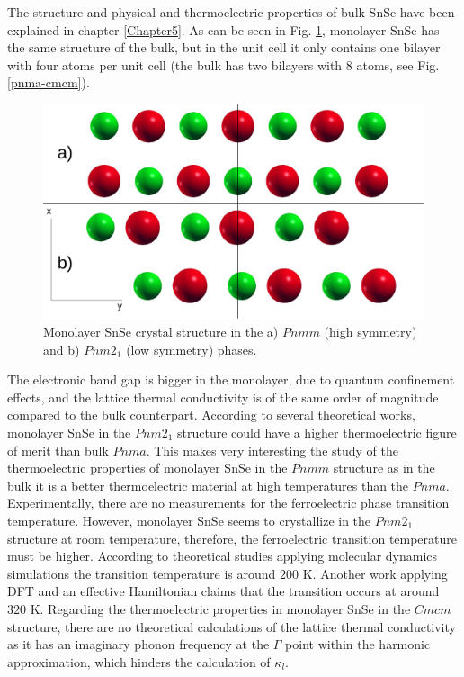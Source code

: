 The structure and physical and thermoelectric properties of bulk SnSe have been explained in chapter \ref{Chapter5}. 
As can be seen in Fig. \ref{pnma-cmcm-mono}, monolayer SnSe has the same structure of the bulk, but in the unit cell 
it only contains one bilayer with four atoms per unit cell (the bulk has two bilayers with 8 atoms, see 
Fig. \ref{pnma-cmcm}). 
\begin{figure}[h]
\begin{center}
\includegraphics[width=0.8\linewidth]{Figures/monolayer-structure.pdf}
\caption{Monolayer SnSe crystal structure in the a) $Pnmm$ (high symmetry) and b) $Pnm2_{1}$ (low symmetry) phases.}
\label{pnma-cmcm-mono}
\end{center}
\end{figure}
The electronic band gap is bigger in the monolayer\cite{wang2015thermoelectric,hu2017high}, due to quantum 
confinement effects, and the lattice thermal conductivity is of the same order of 
magnitude\cite{wang2015thermoelectric,hu2017high} compared to the bulk counterpart. According to several theoretical 
works, monolayer SnSe in the $Pnm2_{1}$ structure could have a higher thermoelectric figure of 
merit\cite{wang2015thermoelectric,hu2017high} than bulk $Pnma$. This makes very interesting the study of the 
thermoelectric properties of monolayer SnSe in the $Pnmm$ structure as in the bulk it is a better thermoelectric 
material at high temperatures than the $Pnma$. \\

Experimentally, there are no measurements for the ferroelectric phase transition temperature. However, monolayer 
SnSe seems to crystallize in the $Pnm2_{1}$ structure at room temperature\cite{li2013single}, therefore, the 
ferroelectric transition temperature must be higher. According to theoretical studies applying molecular dynamics 
simulations\cite{mehboudi2016structural,barraza2018tuning} the transition temperature is around $200$ K. Another 
work applying DFT and an effective Hamiltonian claims\cite{fei2016ferroelectricity} that the transition occurs at 
around $320$ K. Regarding the thermoelectric properties in monolayer SnSe in the $Cmcm$ structure, there are no 
theoretical calculations of the lattice thermal conductivity as it has an imaginary phonon frequency at the $\Gamma$ 
point within the harmonic approximation, which hinders the calculation of $\kappa_{l}$. \\

